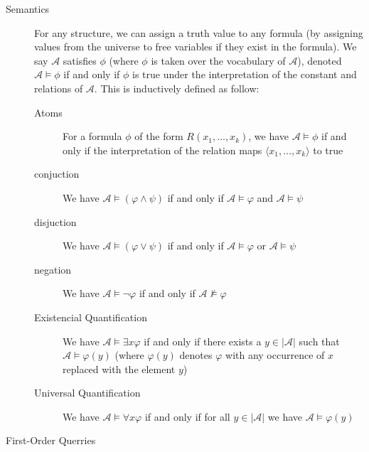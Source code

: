 \begin{description}
    \item[Semantics] For any structure, we can assign a truth value to any formula (by assigning values from the universe to free variables if they exist in the formula). We say $\mathcal{A}$ satisfies $\phi$ (where $\phi$ is taken over the vocabulary of $\mathcal{A}$), denoted $\mathcal{A} \models \phi$ if and only if $\phi$ is true under the interpretation of the constant and relations of $\mathcal{A}$. This is inductively defined as follow:
    \begin{description}
        \item[Atoms] For a formula $\phi$ of the form $R(x_1, \dots, x_k)$, we have $\mathcal{A} \models \phi$ if and only if the interpretation of the relation maps $\langle x_1, \dots, x_k \rangle$ to true
        \item[conjuction] We have $\mathcal{A} \models (\varphi \land \psi)$ if and only if $\mathcal{A} \models \varphi$ and $\mathcal{A} \models \psi$
        \item[disjuction]  We have $\mathcal{A} \models (\varphi \lor \psi)$ if and only if $\mathcal{A} \models \varphi$ or $\mathcal{A} \models \psi$
        \item[negation] We have $\mathcal{A} \models \lnot \varphi$ if and only if $\mathcal{A} \not\models \varphi$
        \item[Existencial Quantification] We have $\mathcal{A} \models \exists x\varphi$ if and only if there exists a $y \in |\mathcal{A}|$ such that $\mathcal{A} \models \varphi(y)$ (where $\varphi(y)$ denotes $\varphi$ with any occurrence of $x$ replaced with the element $y$)
        \item[Universal Quantification] We have $\mathcal{A} \models \forall x\varphi$ if and only if for all $y \in |\mathcal{A}|$ we have $\mathcal{A} \models \varphi(y)$
    \end{description}
    \item[First-Order Querries] %
\end{description}


